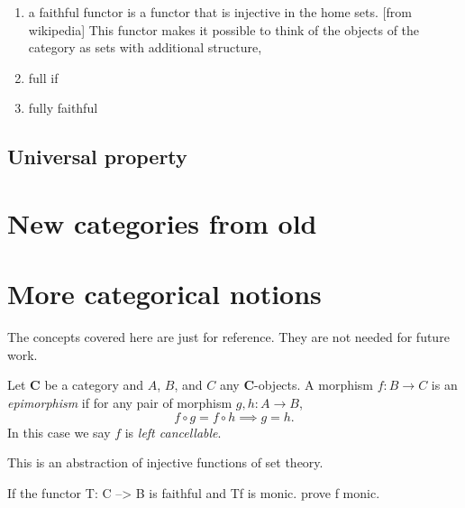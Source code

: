\begin{definition}
    \begin{enumerate}[label=(\roman*)]
        \item a faithful functor is a functor that is injective in the home sets. [from wikipedia] This functor makes it possible to think of the objects of the category as sets with additional structure,
        \item full if 
        \item fully faithful
    \end{enumerate}
     
    
    
\end{definition}






\subsection{Universal property}


\section{New categories from old}


\section{More categorical notions}

The concepts covered here are just for reference. 
They are not needed for future work.

\begin{definition}[Monomorphism]
    Let \(\mathbf{C}\) be a category and \(A\), \(B\), and \(C\) any   \(\mathbf{C}\)-objects.
    A morphism \(f\colon B\to C\) is an \textit{epimorphism} if for any pair of morphism \(g,h\colon A\to B\), \[f\circ g = f\circ h\implies g=h.\]
    In this case we say \(f\) is \textit{left cancellable}.
\end{definition}
\begin{remark}
    This is an abstraction of injective functions of set theory.
\end{remark}

\begin{example}
    [maclane] If the functor T: C --> B is faithful and Tf is monic. prove f monic.
\end{example}


